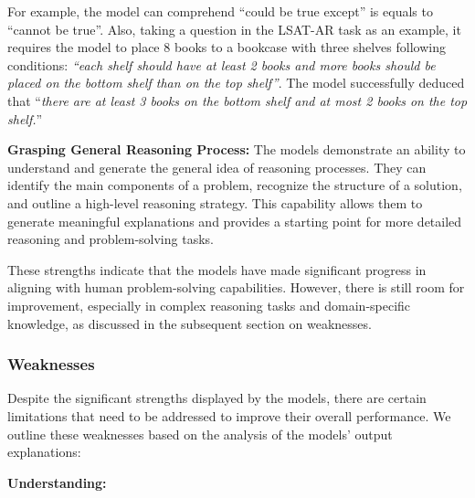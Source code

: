 For example, the model can comprehend ``could be true except'' is equals to ``cannot be true''. Also, taking a question in the LSAT-AR task as an example, it requires the model to place 8 books to a bookcase with three shelves following conditions: \textit{``each shelf should have at least 2 books and more books should be placed on the bottom shelf than on the top shelf''}. The model successfully deduced that ``\textit{there are at least 3 books on the bottom shelf and at most 2 books on the top shelf.}''
\par 
\textbf{Grasping General Reasoning Process:} The models demonstrate an ability to understand and generate the general idea of reasoning processes. They can identify the main components of a problem, recognize the structure of a solution, and outline a high-level reasoning strategy. This capability allows them to generate meaningful explanations and provides a starting point for more detailed reasoning and problem-solving tasks.

These strengths indicate that the models have made significant progress in aligning with human problem-solving capabilities. However, there is still room for improvement, especially in complex reasoning tasks and domain-specific knowledge, as discussed in the subsequent section on weaknesses.

\subsubsection{Weaknesses}
\label{sec:weakness}

Despite the significant strengths displayed by the models, there are certain limitations that need to be addressed to improve their overall performance. We outline these weaknesses based on the analysis of the models' output explanations:

\textbf{Understanding:}

